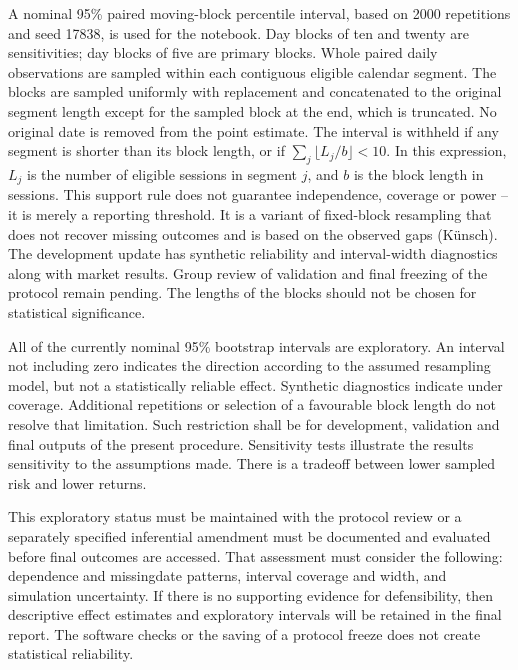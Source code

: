 \documentclass[11pt,a4paper]{article}
\begin{document}
A nominal 95\% paired moving-block percentile interval, based on 2000 repetitions and seed 17838, is used for the notebook. Day blocks of ten and twenty are sensitivities; day blocks of five are primary blocks. Whole paired daily observations are sampled within each contiguous eligible calendar segment. The blocks are sampled uniformly with replacement and concatenated to the original segment length except for the sampled block at the end, which is truncated. No original date is removed from the point estimate. The interval is withheld if any segment is shorter than its block length, or if \(\sum_j \lfloor L_j / b\rfloor < 10\). In this expression, \(L_j\) is the number of eligible sessions in segment \(j\), and \(b\) is the block length in sessions. This support rule does not guarantee independence, coverage or power -- it is merely a reporting threshold. It is a variant of fixed-block resampling that does not recover missing outcomes and is based on the observed gaps (Künsch). The development update has synthetic reliability and interval-width diagnostics along with market results. Group review of validation and final freezing of the protocol remain pending. The lengths of the blocks should not be chosen for statistical significance.

All of the currently nominal 95\% bootstrap intervals are exploratory. An interval not including zero indicates the direction according to the assumed resampling model, but not a statistically reliable effect. Synthetic diagnostics indicate under coverage. Additional repetitions or selection of a favourable block length do not resolve that limitation. Such restriction shall be for development, validation and final outputs of the present procedure. Sensitivity tests illustrate the results sensitivity to the assumptions made. There is a trade\allowbreak{}off between lower sampled risk and lower returns.

This exploratory status must be maintained with the protocol review or a separately specified inferential amendment must be documented and evaluated before final outcomes are accessed. That assessment must consider the following: dependence and missing\allowbreak{}date patterns, interval coverage and width, and simulation uncertainty. If there is no supporting evidence for defensibility, then descriptive effect estimates and exploratory intervals will be retained in the final report. The software checks or the saving of a protocol freeze does not create statistical reliability.
\end{document}
